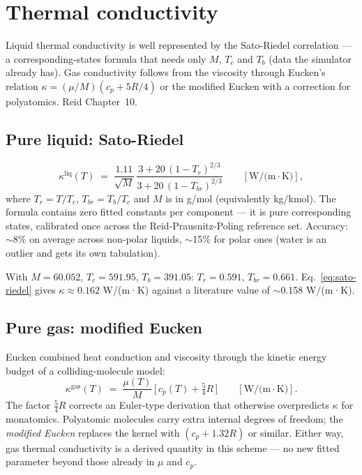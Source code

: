 \documentclass[11pt,a4paper]{article}
\begin{document}
\section{Thermal conductivity}\label{ch:thermal-cond}

\begin{whatyoulllearn}
Liquid thermal conductivity is well represented by the Sato-Riedel
correlation --- a corresponding-states formula that needs only $M$,
$T_c$ and $T_b$ (data the simulator already has).  Gas conductivity
follows from the viscosity through Eucken's relation
$\kappa = (\mu / M)(c_p + 5R/4)$ or the modified Eucken with a
correction for polyatomics.  Reid Chapter~10.
\end{whatyoulllearn}

\subsection{Pure liquid: Sato-Riedel}

\begin{equation}
   \boxed{\;
   \kappa^{\mathrm{liq}}(T) \;=\;
     \frac{1.11}{\sqrt{M}}\,
     \frac{3 + 20\,(1 - T_r)^{2/3}}{3 + 20\,(1 - T_{br})^{2/3}}
     \qquad [\text{W/(m$\cdot$K)}],
   \;}
   \label{eq:sato-riedel}
\end{equation}
where $T_r = T / T_c$, $T_{br} = T_b / T_c$ and $M$ is in g/mol
(equivalently kg/kmol).  The formula contains zero fitted constants
per component --- it is pure corresponding states, calibrated once
across the Reid-Prausnitz-Poling reference set.  Accuracy:
$\sim$8\% on average across non-polar liquids, $\sim$15\% for polar
ones (water is an outlier and gets its own tabulation).

\begin{example}
With $M = 60.052$, $T_c = 591.95$, $T_b = 391.05$:  $T_r = 0.591$,
$T_{br} = 0.661$.  Eq.~\eqref{eq:sato-riedel} gives
$\kappa \approx 0.162$ W/(m·K) against a literature value of
$\sim$0.158 W/(m·K).
\end{example}

\subsection{Pure gas: modified Eucken}

Eucken combined heat conduction and viscosity through the kinetic
energy budget of a colliding-molecule model:
\begin{equation}
   \boxed{\;
   \kappa^{\mathrm{gas}}(T) \;=\;
     \frac{\mu(T)}{M}\,\bigl[\,c_p(T) + \tfrac{5}{4}R\,\bigr]
     \qquad [\text{W/(m$\cdot$K)}].
   \;}
   \label{eq:eucken}
\end{equation}
The factor $\tfrac{5}{4}R$ corrects an Euler-type derivation that
otherwise overpredicts $\kappa$ for monatomics.  Polyatomic
molecules carry extra internal degrees of freedom; the
\emph{modified Eucken} replaces the kernel with $(c_p + 1.32 R)$ or
similar.  Either way, gas thermal conductivity is a derived quantity
in this scheme --- no new fitted parameter beyond those already in
$\mu$ and $c_p$.
\end{document}
